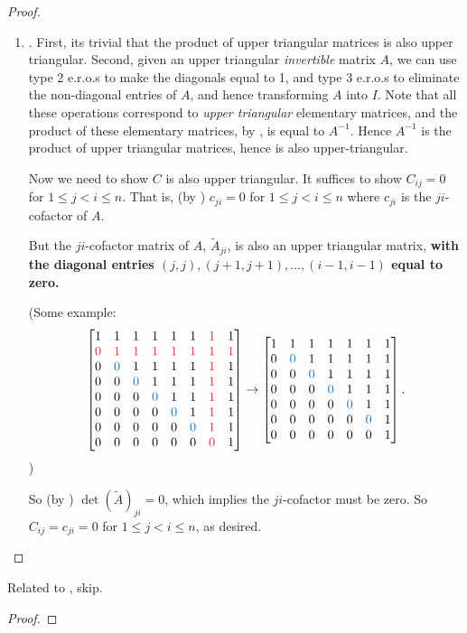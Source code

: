 \begin{proof}
\begin{enumerate}
\item
{}.
First, its trivial that the product of upper triangular matrices is also upper triangular.
Second, given an upper triangular \emph{invertible} matrix \(A\), we can use type 2 e.r.o.s to make the diagonals equal to 1, and type 3 e.r.o.s to eliminate the non-diagonal entries of \(A\), and hence transforming \(A\) into \(I\).
Note that all these operations correspond to \emph{upper triangular} elementary matrices, and the product of these elementary matrices, by , is equal to \(A^{-1}\).
Hence \(A^{-1}\) is the product of upper triangular matrices, hence is also upper-triangular.

Now we need to show \(C\) is also upper triangular.
It suffices to show \(C_{ij} = 0\) for \(1 \le j < i \le n\).
That is, (by ) \(c_{ji} = 0\) for \(1 \le j < i \le n\) where \(c_{ji}\) is the \(ji\)-cofactor of \(A\).

But the \(ji\)-cofactor matrix of \(A\), \(\tilde{A}_{ji}\), is also an upper triangular matrix, \textbf{with the diagonal entries \((j,j), (j+1, j+1), ..., (i - 1, i - 1)\) equal to zero.}

(Some example:
\[
    \begin{bmatrix}
  1 & 1 & 1 & 1 & 1 & 1 & \RED{1} & 1 \\
  \RED{0} & \RED{1} & \RED{1} & \RED{1} & \RED{1} & \RED{1} & \RED{1} & \RED{1} \\
  0 & \BLUE{0} & 1 & 1 & 1 & 1 & \RED{1} & 1 \\
  0 & 0 & \BLUE{0} & 1 & 1 & 1 & \RED{1} & 1 \\
  0 & 0 & 0 & \BLUE{0} & 1 & 1 & \RED{1} & 1 \\
  0 & 0 & 0 & 0 & \BLUE{0} & 1 & \RED{1} & 1 \\
  0 & 0 & 0 & 0 & 0 & \BLUE{0} & \RED{1} & 1 \\
  0 & 0 & 0 & 0 & 0 & 0 & \RED{0} & 1
\end{bmatrix}
\to
\begin{bmatrix}
  1 & 1 & 1 & 1 & 1 & 1 & 1 \\
  0 & \BLUE{0} & 1 & 1 & 1 & 1 & 1 \\
  0 & 0 & \BLUE{0} & 1 & 1 & 1 & 1 \\
  0 & 0 & 0 & \BLUE{0} & 1 & 1 & 1 \\
  0 & 0 & 0 & 0 & \BLUE{0} & 1 & 1 \\
  0 & 0 & 0 & 0 & 0 & \BLUE{0} & 1 \\
  0 & 0 & 0 & 0 & 0 & 0 & 1
\end{bmatrix}.
\]
)

So (by ) \(\det(\tilde{A})_{ji} = 0\), which implies the \(ji\)-cofactor must be zero.
So \(C_{ij} = c_{ji} = 0\) for \(1 \le j < i \le n\), as desired.
\end{enumerate}
\end{proof}

\begin{exercise} \label{exercise 4.3.28}
Related to , skip.
\end{exercise}

\begin{proof}
\end{proof}
